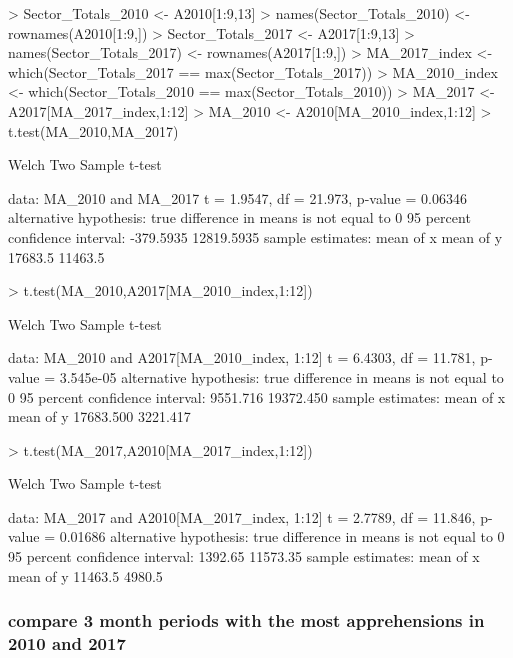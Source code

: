 \documentclass[letterpaper]{article}
\begin{document}
\begin{Schunk}
\begin{Sinput}
> Sector_Totals_2010 <- A2010[1:9,13]
> names(Sector_Totals_2010) <- rownames(A2010[1:9,])
> Sector_Totals_2017 <- A2017[1:9,13]
> names(Sector_Totals_2017) <- rownames(A2017[1:9,])
> MA_2017_index <- which(Sector_Totals_2017 == max(Sector_Totals_2017))
> MA_2010_index <- which(Sector_Totals_2010 == max(Sector_Totals_2010))
> MA_2017 <- A2017[MA_2017_index,1:12]
> MA_2010 <- A2010[MA_2010_index,1:12]
> t.test(MA_2010,MA_2017)
\end{Sinput}
\begin{Soutput}
	Welch Two Sample t-test

data:  MA_2010 and MA_2017
t = 1.9547, df = 21.973, p-value = 0.06346
alternative hypothesis: true difference in means is not equal to 0
95 percent confidence interval:
  -379.5935 12819.5935
sample estimates:
mean of x mean of y 
  17683.5   11463.5 
\end{Soutput}
\begin{Sinput}
> t.test(MA_2010,A2017[MA_2010_index,1:12])
\end{Sinput}
\begin{Soutput}
	Welch Two Sample t-test

data:  MA_2010 and A2017[MA_2010_index, 1:12]
t = 6.4303, df = 11.781, p-value = 3.545e-05
alternative hypothesis: true difference in means is not equal to 0
95 percent confidence interval:
  9551.716 19372.450
sample estimates:
mean of x mean of y 
17683.500  3221.417 
\end{Soutput}
\begin{Sinput}
> t.test(MA_2017,A2010[MA_2017_index,1:12])
\end{Sinput}
\begin{Soutput}
	Welch Two Sample t-test

data:  MA_2017 and A2010[MA_2017_index, 1:12]
t = 2.7789, df = 11.846, p-value = 0.01686
alternative hypothesis: true difference in means is not equal to 0
95 percent confidence interval:
  1392.65 11573.35
sample estimates:
mean of x mean of y 
  11463.5    4980.5 
\end{Soutput}
\end{Schunk}

\subsubsection{compare 3 month periods with the most apprehensions in 2010 and 2017}
\end{document}
